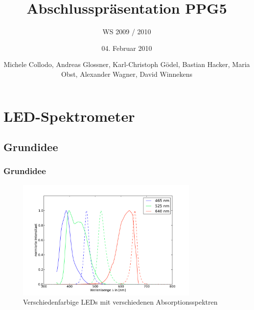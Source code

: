 \documentclass[10pt]{beamer}
\title{Abschlusspr\"asentation PPG5}
\subtitle{WS 2009 / 2010}
\author{04. Februar 2010}
\date{Michele Collodo, Andreas Glossner, Karl-Christoph G\"odel, Bastian Hacker, Maria Obst, Alexander Wagner, David Winnekens}
\begin{document}
\frame
{
\titlepage
}

\section{LED-Spektrometer}
\subsection[]{Grundidee}
\frame
{
\frametitle{Grundidee}
\begin{figure}
\begin{center}
\includegraphics[width=0.8\textwidth]{./images/absorp-emit.pdf}
\caption{Verschiedenfarbige LEDs mit verschiedenen Absorptionsspektren}
\end{center}
\end{figure}
}
\end{document}

